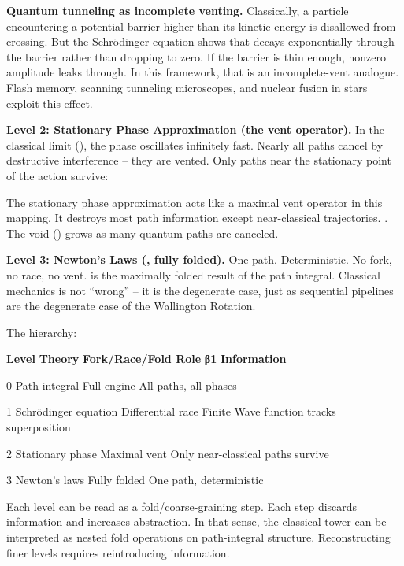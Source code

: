 \documentclass[
]{article}
\begin{document}
\textbf{Quantum tunneling as incomplete venting.} Classically, a
particle encountering a potential barrier higher than its kinetic energy
is disallowed from crossing. But the Schrödinger equation shows that
decays exponentially through the barrier rather than dropping to zero.
If the barrier is thin enough, nonzero amplitude leaks through. In this
framework, that is an incomplete-vent analogue. Flash memory, scanning
tunneling microscopes, and nuclear fusion in stars exploit this effect.

\textbf{Level 2: Stationary Phase Approximation (the vent operator).} In
the classical limit (), the phase oscillates infinitely fast. Nearly all
paths cancel by destructive interference -- they are vented. Only paths
near the stationary point of the action survive:

The stationary phase approximation acts like a maximal vent operator in
this mapping. It destroys most path information except near-classical
trajectories. . The void () grows as many quantum paths are canceled.

\textbf{Level 3: Newton's Laws (, fully folded).} One path.
Deterministic. No fork, no race, no vent. is the maximally folded result
of the path integral. Classical mechanics is not ``wrong'' -- it is the
degenerate case, just as sequential pipelines are the degenerate case of
the Wallington Rotation.

The hierarchy:

\textbf{Level} \textbar{} \textbf{Theory} \textbar{}
\textbf{Fork/Race/Fold Role} \textbar{} \textbf{β1\hspace{0pt}}
\textbar{} \textbf{Information} \textbar{}

0 \textbar{} Path integral \textbar{} Full engine \textbar{} \textbar{}
All paths, all phases \textbar{}

1 \textbar{} Schrödinger equation \textbar{} Differential race
\textbar{} Finite \textbar{} Wave function tracks superposition
\textbar{}

2 \textbar{} Stationary phase \textbar{} Maximal vent \textbar{}
\textbar{} Only near-classical paths survive \textbar{}

3 \textbar{} Newton's laws \textbar{} Fully folded \textbar{} \textbar{}
One path, deterministic \textbar{}

Each level can be read as a fold/coarse-graining step. Each step
discards information and increases abstraction. In that sense, the
classical tower can be interpreted as nested fold operations on
path-integral structure. Reconstructing finer levels requires
reintroducing information.
\end{document}
